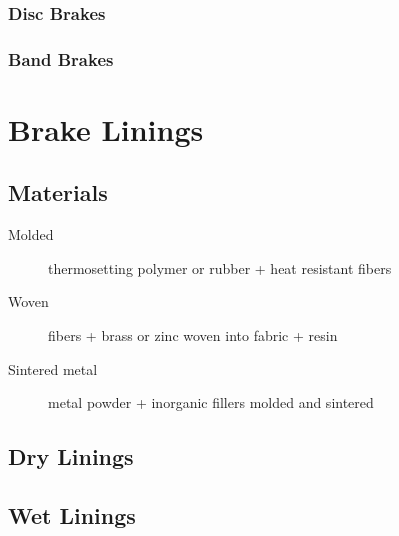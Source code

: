 \documentclass[
10pt,
a4paper,
openany,
svgnames,
]{book}
\begin{document}
\begin{center}
\end{center}

\subsubsection*{Disc Brakes}
\label{sec:orgd871f42}

\begin{center}
\end{center}

\subsubsection*{Band Brakes}
\label{sec:org3298d4e}

\begin{center}
\end{center}

\section*{Brake Linings}
\label{sec:org6c5f14b}

\subsection*{Materials}
\label{sec:org8e18b90}

\begin{description}
\item[{Molded}] thermosetting polymer or rubber + heat resistant fibers
\item[{Woven}] fibers + brass or zinc woven into fabric + resin
\item[{Sintered metal}] metal powder + inorganic fillers molded and sintered
\end{description}

\subsection*{Dry Linings}
\label{sec:org89b9357}

\begin{center}
\end{center}

\subsection*{Wet Linings}
\label{sec:orgbcf0414}
\end{document}
